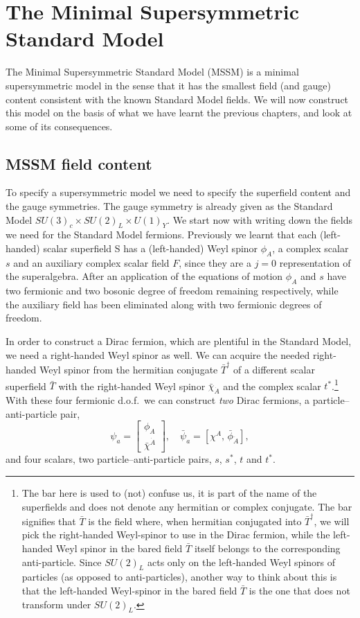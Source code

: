 \documentclass[notes.tex]{subfiles}
\begin{document}
\chapter{The Minimal Supersymmetric Standard Model}
\label{chap:mssm}
The Minimal Supersymmetric Standard Model (MSSM) is a minimal supersymmetric model in the sense that it has the smallest field (and gauge) content consistent with the known Standard Model fields. We will now construct this model on the basis of what we have learnt the previous chapters, and look at some of its consequences.


\section{MSSM field content}
To specify a supersymmetric model we need to specify the superfield content and the gauge symmetries. The gauge symmetry is already given as the Standard Model $SU(3)_c\times SU(2)_L\times U(1)_Y$. We start now with writing down the fields we need for the Standard Model fermions. Previously we learnt that each (left-handed) scalar superfield S has a (left-handed) Weyl spinor $\phi_A$, a complex scalar $s$ and an auxiliary complex scalar field $F$, since they are a $j=0$ representation of the superalgebra. After an application of the equations of motion $\phi_A$ and $s$ have two fermionic and two bosonic degree of freedom remaining respectively, while the auxiliary field has been eliminated along with two fermionic degrees of freedom. 

In order to construct a Dirac fermion, which are plentiful in the Standard Model, we need a right-handed Weyl spinor as well. We can acquire the needed right-handed Weyl spinor from the hermitian conjugate $\bar{T}^\dagger$ of a different scalar superfield $\bar{T}$ with the right-handed Weyl spinor $\bar\chi_{\dot{A}}$ and the complex scalar $t^*$.\footnote{The bar here is used to (not) confuse us, it is part of the name of the superfields and does not denote any hermitian or complex conjugate. The bar signifies that $\bar T$ is the field where, when hermitian conjugated into $\bar{T}^\dagger$, we will pick the right-handed Weyl-spinor to use in the Dirac fermion, while the left-handed Weyl spinor in the bared field $\bar T$  itself belongs to the corresponding anti-particle. Since $SU(2)_L$ acts only on the left-handed Weyl spinors of particles (as opposed to anti-particles), another way to think about this is that the left-handed Weyl-spinor in the bared field  $\bar T$ is the one that does not transform under $SU(2)_L$.} With these four fermionic d.o.f.\ we can construct {\it two} Dirac fermions, a particle--anti-particle pair,
\[ \psi_a= \left[ \begin{matrix}\phi_A \\ \bar\chi^{\dot{A}} \end{matrix} \right], \quad  \bar\psi_a= \left[ \chi^A ,\, \bar\phi_{\dot{A}}  \right], \]
and four scalars, two particle--anti-particle pairs, $s$, $s^*$, $t$ and $t^*$.
\end{document}
